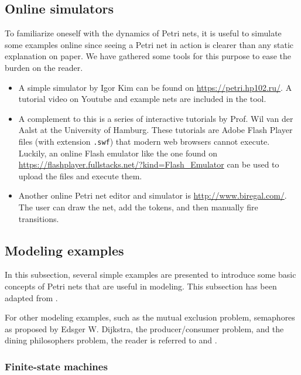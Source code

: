 \subsection{Online simulators}

To familiarize oneself with the dynamics of Petri nets,
it is useful to simulate some examples online
since seeing a Petri net in action is clearer than any static explanation on paper.
We have gathered some tools for this purpose to ease the burden on the reader.

\begin{itemize}
      \item A simple simulator by Igor Kim can be found on \url{https://petri.hp102.ru/}.
            A tutorial video on Youtube and example nets are included in the tool.
      \item A complement to this is a series of interactive tutorials by Prof. Wil van der Aalst
            at the University of Hamburg. These tutorials are Adobe Flash Player files (with extension \texttt{.swf})
            that modern web browsers cannot execute.
            Luckily, an online Flash emulator like the one found on \url{https://flashplayer.fullstacks.net/?kind=Flash_Emulator}
            can be used to upload the files and execute them.
      \item Another online Petri net editor and simulator is \url{http://www.biregal.com/}.
            The user can draw the net, add the tokens, and then manually fire transitions.
\end{itemize}

\subsection{Modeling examples}

In this subsection, several simple examples are presented to introduce
some basic concepts of Petri nets that are useful in modeling.
This subsection has been adapted from \cite{murata1989}.

For other modeling examples, such as the mutual exclusion problem,
semaphores as proposed by Edsger W. Dijkstra, the producer/consumer problem,
and the dining philosophers problem, the reader is referred to
\cite[Chap. 3]{peterson1981} and \cite{reisig2013}.

\subsubsection{Finite-state machines}

